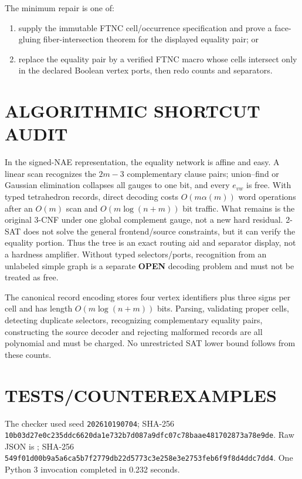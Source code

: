 \documentclass[11pt]{article}
\newcommand{\OPEN}{\textbf{OPEN}}
\begin{document}
The minimum repair is one of:
\begin{enumerate}
\item supply the immutable FTNC cell/occurrence specification and prove a
face-gluing fiber-intersection theorem for the displayed equality pair; or
\item replace the equality pair by a verified FTNC macro whose cells intersect
only in the declared Boolean vertex ports, then redo counts and separators.
\end{enumerate}

\section{ALGORITHMIC SHORTCUT AUDIT}
In the signed-NAE representation, the equality network is affine and easy.
A linear scan recognizes the $2m-3$ complementary clause pairs; union--find or
Gaussian elimination collapses all gauges to one bit, and every $e_{vw}$ is
free.  With typed tetrahedron records, direct decoding costs
$O(m\alpha(m))$ word operations after an $O(m)$ scan and
$O(m\log(n+m))$ bit traffic.  What remains is the original 3-CNF under one
global complement gauge, not a new hard residual.  2-SAT does not solve the
general frontend/source constraints, but it can verify the equality portion.
Thus the tree is an exact routing aid and separator display, not a hardness
amplifier.  Without typed selectors/ports, recognition from an unlabeled simple
graph is a separate \OPEN{} decoding problem and must not be treated as free.

The canonical record encoding stores four vertex identifiers plus three signs
per cell and has length $O(m\log(n+m))$ bits.  Parsing, validating proper cells,
detecting duplicate selectors, recognizing complementary equality pairs,
constructing the source decoder and rejecting malformed records are all
polynomial and must be charged.  No unrestricted SAT lower bound follows from
these counts.

\section{TESTS/COUNTEREXAMPLES}
The checker
 used seed
\texttt{202610190704}; SHA-256
\texttt{10b03d27e0c235ddc6620da1e732b7d087a9dfc07c78baae481702873a78e9de}.
Raw JSON is
; SHA-256
\texttt{549f01d00b9a5a6ca5b7f2779db22d5773c3e258e3e2753feb6f9f8d4ddc7dd4}.
One Python 3 invocation completed in 0.232 seconds.
\end{document}
